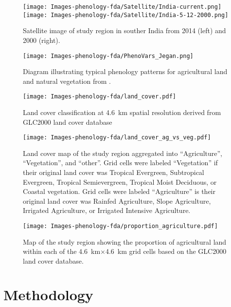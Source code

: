 \begin{figure}
	[htbp] \centering 
	\texttt{[image: Images-phenology-fda/Satellite/India-current.png]} 
	\texttt{[image: Images-phenology-fda/Satellite/India-5-12-2000.png]} \caption{Satellite image of study region in souther India from 2014 (left) and 2000 (right).} \label{fig:phenology diagram} 
\end{figure}
\begin{figure}
	[htbp] \centering 
	\texttt{[image: Images-phenology-fda/PhenoVars\_Jegan.png]} \caption{Diagram illustrating typical phenology patterns for agricultural land and natural vegetation from \cite{Dash:2010kva}. } \label{fig:phenology diagram} 
\end{figure}
\begin{figure}
	[htbp] \centering 
	\texttt{[image: Images-phenology-fda/land\_cover.pdf]} \caption{Land cover classification at 4.6~km spatial resolution derived from GLC2000 land cover database} \label{fig:land cover} 
\end{figure}
\begin{figure}
	[htbp] \centering 
	\texttt{[image: Images-phenology-fda/land\_cover\_ag\_vs\_veg.pdf]} \caption{Land cover map of the study region aggregated into ``Agriculture'', ``Vegetation'', and ``other''. Grid cells were labeled ``Vegetation'' if their original land cover was Tropical Evergreen, Subtropical Evergreen, Tropical Semievergreen, Tropical Moist Deciduous, or Coastal vegetation. Grid cells were labeled ``Agriculture'' is their original land cover was Rainfed Agriculture, Slope Agriculture, Irrigated Agriculture, or Irrigated Intensive Agriculture. } \label{fig:land cover ag vs. veg} 
\end{figure}
\begin{figure}
	[htbp] \centering 
	\texttt{[image: Images-phenology-fda/proportion\_agriculture.pdf]} \caption{Map of the study region showing the proportion of agricultural land within each of the 4.6~km$\times$4.6~km grid cells based on the GLC2000 land cover database. } \label{fig:proportion agriculture} 
\end{figure}

\section{Methodology} 

